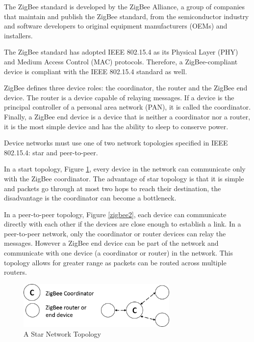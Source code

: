 The ZigBee standard is developed by the ZigBee Alliance, a group of companies that maintain and publish the ZigBee standard, from the semiconductor industry and software developers to original equipment manufacturers (OEMs) and installers. 

The ZigBee standard has adopted IEEE 802.15.4 as its Physical Layer (PHY) and Medium Access Control (MAC) protocols. Therefore, a ZigBee-compliant device is compliant with the IEEE 802.15.4 standard as well. 

ZigBee defines three device roles: the coordinator, the router and the ZigBee end device. The router is a device capable of relaying messages. If a device is the principal controller of a personal area network (PAN), it is called the coordinator. Finally, a ZigBee end device is a device that is neither a coordinator nor a router, it is the most simple device and has the ability to sleep to conserve power.




Device networks must use one of two network topologies specified in IEEE 802.15.4: star and peer-to-peer. 

In a start topology, Figure \ref{zigbee1}, every device in the network can communicate only with the ZigBee coordinator. The advantage of star topology is that it is simple and packets go through at most two hops to reach their destination, the disadvantage is the coordinator can become a bottleneck.

In a peer-to-peer topology, Figure \ref{zigbee2}, each device can communicate directly with each other if the devices are close enough to establish a link. In a peer-to-peer network, only the coordinator or router devices can relay the messages. However a ZigBee end device can be part of the network and communicate with one device (a coordinator or router) in the network. This topology allows for greater range as packets can be routed across multiple routers.


\begin{figure}[h]
\centering
\includegraphics[width=0.7\textwidth]{Figures/zigbee1}
\caption{A Star Network Topology}
\label{zigbee1}
\end{figure}

